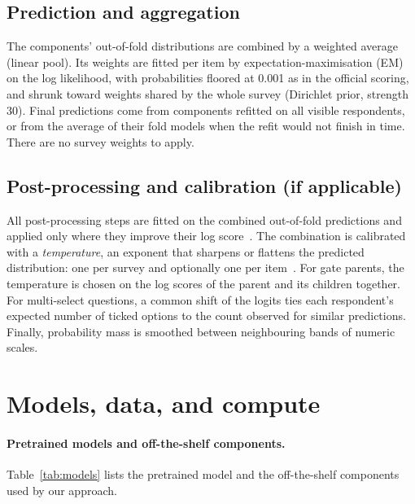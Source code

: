 \documentclass{article}
\begin{document}
\subsection{Prediction and aggregation}
The components' out-of-fold distributions are combined by a weighted average (linear pool). Its
weights are fitted per item by expectation-maximisation (EM)~\citep{dempster1977em} on the log
likelihood, with probabilities floored at 0.001 as in the official scoring, and shrunk toward
weights shared by the whole survey (Dirichlet prior, strength 30). Final predictions come from
components refitted on all visible respondents, or from the average of their fold models when the refit
would not finish in time. There are no survey weights to apply.

\subsection{Post-processing and calibration (if applicable)}
All post-processing steps are fitted on the combined out-of-fold predictions and applied only where
they improve their log score~\citep{gneiting2007scoring}. The combination is calibrated with a
\emph{temperature}, an exponent that sharpens or flattens the predicted distribution: one per survey
and optionally one per item~\citep{guo2017calibration}. For gate parents, the temperature
is chosen on the log scores of the parent and its children together. For multi-select questions, a
common shift of the logits ties each respondent's expected number of ticked options to the count observed
for similar predictions. Finally, probability mass is smoothed between neighbouring bands of numeric
scales.

\section{Models, data, and compute}
\label{sec:resources}

\paragraph{Pretrained models and off-the-shelf components.} Table~\ref{tab:models} lists the
pretrained model and the off-the-shelf components used by our approach.
\end{document}
